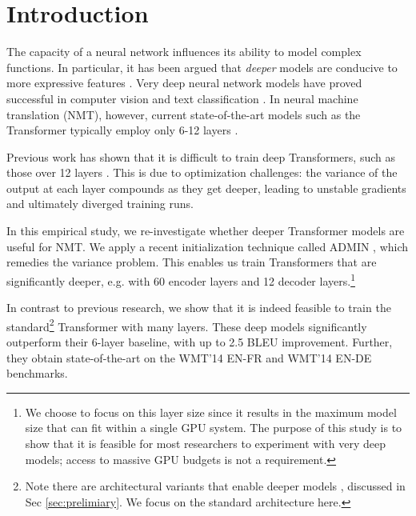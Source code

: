 
\section{Introduction}
\label{sec:intro}

The capacity of a neural network influences its ability to model complex functions. 
In particular, it has been argued that \textit{deeper} models are conducive to more expressive features \cite{bengio09book}.
Very deep neural network models have proved successful in computer vision \cite{he2016resnet,srivastava2015deepnn} and text classification \cite{conneau2017deepclassification,minaee2020deep}.
In neural machine translation (NMT), however, current state-of-the-art models such as the Transformer typically employ only 6-12 layers \cite{wmt19edinburg, wmt19ms, wmt19fair}.

Previous work has shown that it is difficult to train deep Transformers, such as those over 12 layers \cite{bapna2018training}.
This is due to optimization challenges: the variance of the output at each layer compounds as they get deeper, leading to unstable gradients and ultimately diverged training runs.


In this empirical study, we re-investigate whether deeper Transformer models are useful for NMT. 
We apply a recent initialization technique called ADMIN \cite{liu2020deeptransformer}, which remedies the variance problem. This enables us train Transformers that are significantly deeper, e.g. with 60 encoder layers and 12 decoder layers.\footnote{We choose to focus on this layer size since it results in the maximum model size that can fit within a single GPU system. The purpose of this study is to show that it is feasible for most researchers to experiment with very deep models; access to massive GPU budgets is not a requirement.}


In contrast to previous research, we show that it is indeed feasible to train the standard\footnote{Note there are architectural variants that enable deeper models \cite{wang2019preln,Nguyen2019fixnorm}, discussed in Sec \ref{sec:prelimiary}. We focus on the standard architecture here.} Transformer \cite{vaswani2017attention} with many layers. 
These deep models significantly outperform their 6-layer baseline, with up to 2.5 BLEU improvement. Further, they obtain state-of-the-art on the WMT'14 EN-FR and WMT'14 EN-DE benchmarks.